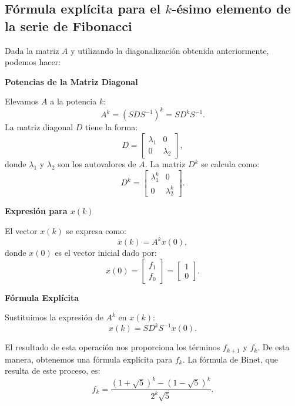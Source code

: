 \documentclass{article}
\begin{document}
\subsection*{Fórmula explícita para el \( k \)-ésimo elemento de la serie de Fibonacci}

Dada la matriz $A$ y utilizando la diagonalización obtenida anteriormente, podemos hacer:


{\bfseries Potencias de la Matriz Diagonal} 

Elevamos \( A \) a la potencia \( k \):
\[
A^k = (S D S^{-1})^k = S D^k S^{-1}.
\]
La matriz diagonal \( D \) tiene la forma:
\[
D = \begin{bmatrix}
\lambda_1 & 0 \\
0 & \lambda_2
\end{bmatrix},
\]
donde \(\lambda_1\) y \(\lambda_2\) son los autovalores de \( A \). La matriz \( D^k \) se calcula como:
\[
D^k = \begin{bmatrix}
\lambda_1^k & 0 \\
0 & \lambda_2^k
\end{bmatrix}.
\]

{\bfseries Expresión para \( x(k) \)} 

El vector \( x(k) \) se expresa como:
\[
x(k) = A^k x(0),
\]
donde \( x(0) \) es el vector inicial dado por:
\[
x(0) = \begin{bmatrix}
f_1 \\
f_0
\end{bmatrix} = \begin{bmatrix}
1 \\
0
\end{bmatrix}.
\]

{\bfseries Fórmula Explícita} 

Sustituimos la expresión de \( A^k \) en \( x(k) \):
\[
x(k) = S D^k S^{-1} x(0).
\]

El resultado de esta operación nos proporciona los términos \( f_{k+1} \) y \( f_k \). De esta manera, obtenemos una fórmula explícita para \( f_k \). La fórmula de Binet, que resulta de este proceso, es:
\[
f_k = \frac{(1 + \sqrt{5})^k - (1 - \sqrt{5})^k}{2^k \sqrt{5}}.
\]
\end{document}
